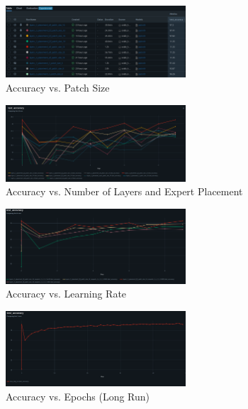 \documentclass[a4paper,11pt]{article}
\begin{document}
\begin{figure}[H]
    \centering
    \includegraphics[width=0.6\textwidth]{images/patch_size.png}
    \caption{Accuracy vs. Patch Size}
    \label{fig:patch_size}
\end{figure}

\begin{figure}[H]
    \centering
    \includegraphics[width=0.6\textwidth]{images/layers_placement.png}
    \caption{Accuracy vs. Number of Layers and Expert Placement}
    \label{fig:layers_placement}
\end{figure}

\begin{figure}[H]
    \centering
    \includegraphics[width=0.6\textwidth]{images/learning_rate.png}
    \caption{Accuracy vs. Learning Rate}
    \label{fig:learning_rate}
\end{figure}

\begin{figure}[H]
    \centering
    \includegraphics[width=0.6\textwidth]{images/long_run.png}
    \caption{Accuracy vs. Epochs (Long Run)}
    \label{fig:long_run}
\end{figure}
\end{document}
